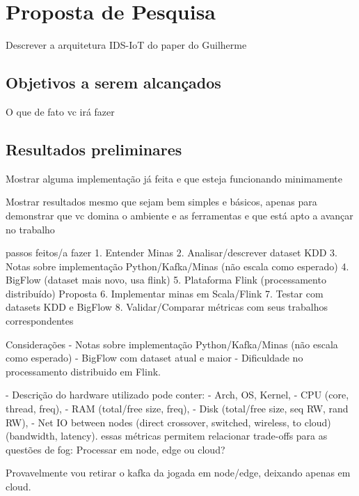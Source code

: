 \chapter{Proposta de Pesquisa}

Descrever a arquitetura IDS-IoT do paper do Guilherme

\section{Objetivos a serem alcançados}

O que de fato vc irá fazer 

\section{Resultados preliminares}

Mostrar alguma implementação já feita e que esteja funcionando minimamente

Mostrar resultados mesmo que sejam bem simples e básicos, apenas para demonstrar que vc domina o ambiente e as ferramentas e que está apto a avançar no trabalho 

passos feitos/a fazer
1. Entender Minas
2. Analisar/descrever dataset KDD
3. Notas sobre implementação Python/Kafka/Minas (não escala como esperado)
4. BigFlow (dataset mais novo, usa flink)
5. Plataforma Flink (processamento distribuído)
Proposta
6. Implementar minas em Scala/Flink
7. Testar com datasets KDD e BigFlow
8. Validar/Comparar métricas com seus trabalhos correspondentes

Considerações
- Notas sobre implementação Python/Kafka/Minas (não escala como esperado)
- BigFlow com dataset atual e maior
- Dificuldade no processamento distribuido em Flink.

- Descrição do hardware utilizado pode conter:
    - Arch, OS, Kernel,
    - CPU (core, thread, freq),
    - RAM (total/free size, freq),
    - Disk (total/free size, seq RW, rand RW),
    - Net IO between nodes (direct crossover, switched, wireless, to cloud) (bandwidth, latency).
essas métricas permitem relacionar trade-offs para as questões de fog: Processar em node, edge ou cloud?

Provavelmente vou retirar o kafka da jogada em node/edge, deixando apenas em cloud.
